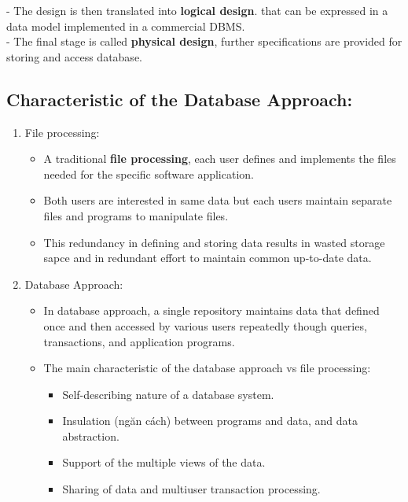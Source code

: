 \documentclass[10pt]{article}
\begin{document}
	- The design is then translated into \textbf{logical design}. that can be expressed in a data model implemented in a commercial DBMS. \\

	- The final stage is called \textbf{physical design}, further specifications are provided for storing and access database. \\

\subsection{Characteristic of the Database Approach: }
\begin{enumerate}
	\item File processing:
	\begin{itemize}
		\item A traditional \textbf{file processing}, each user defines and implements the files needed for the specific software application.
		\item Both users are interested in same data but each users maintain separate files and programs to manipulate files.
		\item This redundancy in defining and storing data results in wasted storage sapce and in redundant effort to maintain common up-to-date data.
	\end{itemize}

	\item Database Approach:
	\begin{itemize}
		\item In database approach, a single repository maintains data that defined once and then accessed by various users repeatedly though queries, transactions, and application programs.
		\item The main characteristic of the database approach vs file processing:
		\begin{itemize}
			\item Self-describing nature of a database system.
			\item Insulation (ngăn cách) between programs and data, and data abstraction.
			\item Support of the multiple views of the data.
			\item Sharing of data and multiuser transaction processing.
		\end{itemize}
	\end{itemize}


\end{enumerate}
\end{document}

